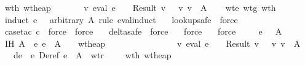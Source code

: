 \begin{isabellebody}
\ \ \ wth{\isacharcolon}\ {\isachardoublequoteopen}wt{\isacharunderscore}heap\ {\isasymSigma}\ {\isasymmu}\ {\isacharbraceleft}{\isacharbraceright}{\isachardoublequoteclose}\isanewline
\ \ \ {\isachardoublequoteopen}{\isasymexists}\ v{\isachardot}\ eval\ e\ {\isasymrho}\ {\isasymmu}\ {\isacharequal}\ Result\ v\ {\isasymand}\ {\isasymSigma}\ {\isasymturnstile}v\ v\ {\isacharcolon}\ A{\isachardoublequoteclose}\isanewline
\isadelimproof
\ \ \endisadelimproof
\isatagproof
{}\isamarkupfalse \ wte\ wtg\ wth\isanewline
\ \ \isamarkupfalse \ {\isacharparenleft}induct\ e\ {\isasymrho}\ {\isasymmu}\ arbitrary{\isacharcolon}\ A\ rule{\isacharcolon}\ eval{\isachardot}induct{\isacharparenright}\isanewline
\ \ \isamarkupfalse \ lookup{\isacharunderscore}safe\ \isamarkupfalse \ force\isanewline
\ \ \isamarkupfalse \ {\isacharparenleft}case{\isacharunderscore}tac\ c{\isacharparenright}\ \isamarkupfalse \ force\ \isamarkupfalse \ force\isanewline
\ \ \isamarkupfalse \ delta{\isacharunderscore}safe\ \isamarkupfalse \ force\isanewline
\ \ \isamarkupfalse \ force\isanewline
\ \ \isamarkupfalse \ force\isanewline
{}\isamarkupfalse \ {\isacharminus}\isanewline
\ \ \isamarkupfalse \ e\ {\isasymrho}\ {\isasymmu}\ A\isanewline
\ \ \isamarkupfalse \ IH{\isacharcolon}\ {\isachardoublequoteopen}{\isasymAnd}A{\isachardot}\ {\isasymlbrakk}{\isasymGamma}\ {\isasymturnstile}\isactrlisub e\ e\ {\isacharcolon}\ A{\isacharsemicolon}\ {\isasymGamma}{\isacharsemicolon}{\isasymSigma}\ {\isasymturnstile}\ {\isasymrho}{\isacharsemicolon}\ wt{\isacharunderscore}heap\ {\isasymSigma}\ {\isasymmu}\ {\isacharbraceleft}{\isacharbraceright}{\isasymrbrakk}\isanewline
\ \ \ \ \ \ \ \ \ \ \ \ {\isasymLongrightarrow}\ {\isasymexists}v{\isachardot}\ eval\ e\ {\isasymrho}\ {\isasymmu}\ {\isacharequal}\ Result\ v\ {\isasymand}\ {\isasymSigma}\ {\isasymturnstile}v\ v\ {\isacharcolon}\ A{\isachardoublequoteclose}\isanewline
\ \ \ \ \ de{\isacharcolon}\ {\isachardoublequoteopen}{\isasymGamma}\ {\isasymturnstile}\isactrlisub e\ Deref\ e\ {\isacharcolon}\ A{\isachardoublequoteclose}\ \ wtr{\isacharcolon}\ {\isachardoublequoteopen}{\isasymGamma}{\isacharsemicolon}{\isasymSigma}\ {\isasymturnstile}\ {\isasymrho}{\isachardoublequoteclose}\ \ wth{\isacharcolon}\ {\isachardoublequoteopen}wt{\isacharunderscore}heap\ {\isasymSigma}\ {\isasymmu}\ {\isacharbraceleft}{\isacharbraceright}{\isachardoublequoteclose}\isanewline

\end{isabellebody}
